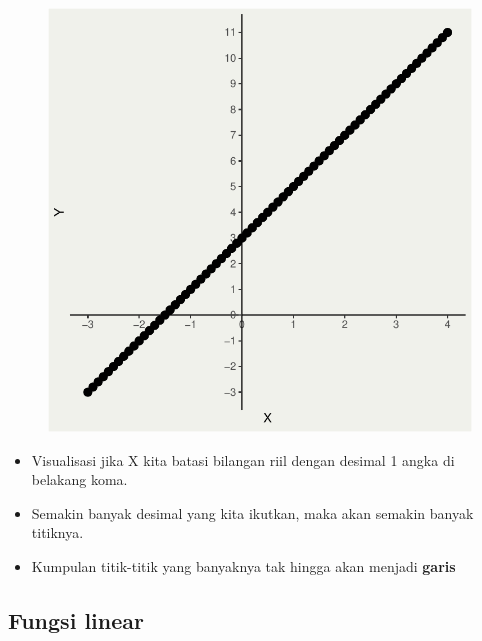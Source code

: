 \documentclass[
  letterpaper,
  DIV=11,
  numbers=noendperiod]{scrartcl}
\begin{document}
\begin{figure}[H]

{\centering \includegraphics{index_files/figure-pdf/unnamed-chunk-3-1.pdf}

}

\end{figure}

\begin{itemize}
\item
  Visualisasi jika X kita batasi bilangan riil dengan desimal 1 angka di
  belakang koma.
\item
  Semakin banyak desimal yang kita ikutkan, maka akan semakin banyak
  titiknya.
\item
  Kumpulan titik-titik yang banyaknya tak hingga akan menjadi
  \textbf{garis}
\end{itemize}

\hypertarget{fungsi-linear}{%
\subsection{Fungsi linear}\label{fungsi-linear}}
\end{document}
